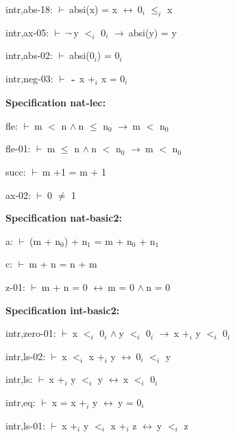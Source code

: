 \documentclass[a4paper]{article}
\newcommand{\tildesym}{\raisebox{-4pt}{\bf\~{}}}
\newcommand{\Fol}{\mbox{$\vdash\ $}}
\newcommand{\Not}{\mbox{$\neg\ $}}
\newcommand{\And}{\mbox{$\wedge\ $}}
\newcommand{\Imp}{\mbox{$\rightarrow\ $}}
\newcommand{\Equiv}{\mbox{$\leftrightarrow\ $}}
\begin{document}
intr,abs-18: 
 \Fol absi(x) = x \Equiv $\mbox{0}_{i}$ $\mbox{$\le$}_{i}$ x



intr,ax-05: 
 \Fol \Not y $\mbox{$<$}_{i}$ $\mbox{0}_{i}$ \Imp absi(y) = y



intr,abs-02: 
 \Fol absi($\mbox{0}_{i}$) = $\mbox{0}_{i}$



intr,neg-03: 
 \Fol $\tildesym$ x $\mbox{+}_{i}$ x = $\mbox{0}_{i}$



{\bf Specification nat-lec:}

fle: 
 \Fol m $<$ n \And n $\le$ $\mbox{n}_{0}$ \Imp m $<$ $\mbox{n}_{0}$



fle-01: 
 \Fol m $\le$ n \And n $<$ $\mbox{n}_{0}$ \Imp m $<$ $\mbox{n}_{0}$



succ: 
 \Fol m +1 = m + 1



ax-02: 
 \Fol 0 $\neq$ 1



{\bf Specification nat-basic2:}

a: 
 \Fol (m + $\mbox{n}_{0}$) + $\mbox{n}_{1}$ = m + $\mbox{n}_{0}$ + $\mbox{n}_{1}$



c: 
 \Fol m + n = n + m



z-01: 
 \Fol m + n = 0 \Equiv m = 0 \And n = 0



{\bf Specification int-basic2:}

intr,zero-01: 
 \Fol x $\mbox{$<$}_{i}$ $\mbox{0}_{i}$ \And y $\mbox{$<$}_{i}$ $\mbox{0}_{i}$ \Imp x $\mbox{+}_{i}$ y $\mbox{$<$}_{i}$ $\mbox{0}_{i}$



intr,ls-02: 
 \Fol x $\mbox{$<$}_{i}$ x $\mbox{+}_{i}$ y \Equiv $\mbox{0}_{i}$ $\mbox{$<$}_{i}$ y



intr,ls: 
 \Fol x $\mbox{+}_{i}$ y $\mbox{$<$}_{i}$ y \Equiv x $\mbox{$<$}_{i}$ $\mbox{0}_{i}$



intr,eq: 
 \Fol x = x $\mbox{+}_{i}$ y \Equiv y = $\mbox{0}_{i}$



intr,ls-01: 
 \Fol x $\mbox{+}_{i}$ y $\mbox{$<$}_{i}$ x $\mbox{+}_{i}$ z \Equiv y $\mbox{$<$}_{i}$ z
\end{document}
